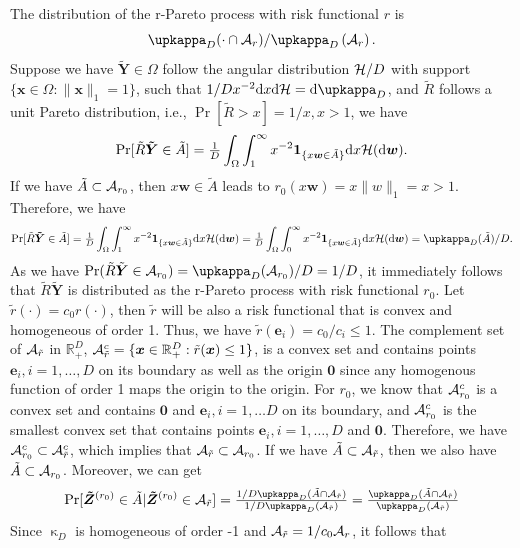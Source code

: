 \documentclass[12pt]{article}
\begin{document}
    The distribution of the r-Pareto process with risk functional $r$ is 
    $$\upkappa_D(\cdot\cap \calA_r )/\upkappa_D\left(\calA_r\right).$$ 
    Suppose we have $\bm{\tilde Y}\in\Omega$ follow the angular distribution ${\mathcal H}/D$ with support $\{\bm x \in \Omega: \|\bm x\|_1 = 1\}$, such that $1/D x^{-2}\text dx\text d\calH = \text d\upkappa_D$,  and $\tilde R$ follows a unit Pareto distribution, i.e., $\Pr[\tilde R>x]=1/x, x>1$, we have
    $${\rm Pr}[\tilde R\bm{\tilde Y}\in \tilde A] = {\textstyle{1\over D}}\int_{\Omega}\int_{1}^{\infty} x^{-2}\bm 1_{\{x\bm w\in \tilde A\}}\text dx{\mathcal H}(\text d\bm w).$$
    If we have $\tilde A\subset{\mathcal A}_{r_0}$, then $x\bm w\in\tilde A$ leads to $r_0(x\bm w)=x\|w\|_1=x >1$. Therefore, we have 
    $$\Pr[\tilde R\bm{\tilde Y}\in \tilde A] = \frac{1}{D}\int_{\Omega}\int_{1}^{\infty} x^{-2}\bm 1_{\{x\bm w\in \tilde A\}}\text dx\calH(\text d\bm w) = \frac{1}{D}\int_{\Omega}\int_{0}^{\infty} x^{-2}\bm 1_{\{x\bm w\in \tilde A\}}\text dx\calH(\text d\bm w) = \upkappa_D(\tilde A)/D.$$ 
    As we have $\Pr( \tilde R\tilde {\bm Y} \in \calA_{r_0}) = \upkappa_D(\calA_{r_0})/D=1/D$, it immediately follows that $\tilde R\bm {\tilde Y}$ is distributed as the r-Pareto process with risk functional $r_0$. Let $\tilde r(\cdot) = c_0 r(\cdot)$, then $\tilde r$ will be also a risk functional that is convex and homogeneous of order 1. Thus, we have $\tilde r(\bm e_i)=c_0/c_i\leq 1$. The complement set of ${\mathcal A}_{\tilde r}$ in $\mathbb R_+^D$, ${\mathcal A}_{\tilde r}^c=\{\bm x\in\mathbb R_+^D: \tilde r(\bm x)\leq 1\}$, is a convex set and contains points $\bm e_i, i=1,\dots,D$ on its boundary as well as the origin $\bm 0$ since any homogenous function of order 1 maps the origin to the origin. For $r_0$, we know that ${\mathcal A}_{r_0}^c$ is a convex set and contains $\bm 0$ and $\bm e_i,i=1,\dots D$ on its boundary, and ${\mathcal A}_{r_0}^c$ is the smallest convex set that contains points $\bm e_i,i=1,\dots,D$ and $\bm 0$. Therefore, we have ${\mathcal A}_{r_0}^c\subset {\mathcal A}_{\tilde r}^c$, which implies that ${\mathcal A}_{\tilde r} \subset {\mathcal A}_{r_0}$. If we have $\tilde A\subset{\mathcal A}_{\tilde r}$, then we also have  $\tilde A\subset{\mathcal A}_{r_0}$. Moreover, we can get
    \begin{equation}
        \Pr[\bm{\tilde Z}^{(r_0)}\in \tilde A | \bm{\tilde Z}^{(r_0)} \in \calA_{\tilde r} ] = \frac{1/D\upkappa_D(\tilde A\cap \calA_{\tilde r})}{1/D\upkappa_D(\calA_{\tilde r})} = \frac{\upkappa_D(\tilde A \cap \calA_{\tilde r})}{\upkappa_D(\calA_{\tilde r})}
    \end{equation}
    Since $\upkappa_D$ is homogeneous of order -1 and ${\mathcal A}_{\tilde r} =  1/c_0{\mathcal A}_r$, it follows that
\end{document}
